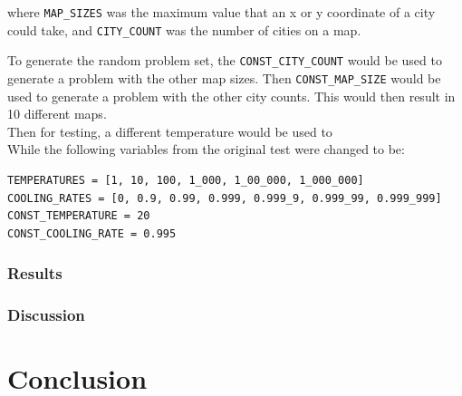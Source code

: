\documentclass{article}
\begin{document}
where \texttt{MAP\_SIZES} was the maximum value that an x or y coordinate of a city could take, and \texttt{CITY\_COUNT} was the number of cities on a map.

To generate the random problem set, the \texttt{CONST\_CITY\_COUNT} would be used to generate a problem with the other map sizes.
Then \texttt{CONST\_MAP\_SIZE} would be used to generate a problem with the other city counts.
This would then result in 10 different maps.
\\

Then for testing, a different temperature would be used to 
\\

While the following variables from the original test were changed to be:

\begin{verbatim}
TEMPERATURES = [1, 10, 100, 1_000, 1_00_000, 1_000_000]
COOLING_RATES = [0, 0.9, 0.99, 0.999, 0.999_9, 0.999_99, 0.999_999]
CONST_TEMPERATURE = 20
CONST_COOLING_RATE = 0.995
\end{verbatim}

\subsubsection{Results}

\subsubsection{Discussion}

\newpage
\section{Conclusion}



\newpage
\end{document}
